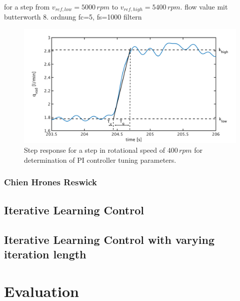 for a step from $v_{ref,low}=5000\, rpm$ to $v_{ref,high}=5400\, rpm$.
flow value mit butterworth 8. ordnung fc=5, fs=1000 filtern

\begin{figure}[ht]
  \centering
  \includegraphics[width=\textwidth]{images/chapt_5/param_calc_PI.pdf}
  \caption[Step response for determination of PI controller tuning parameters]{Step response for a step in rotational speed of $400\,rpm$ for determination of PI controller tuning parameters.}
  \label{fig:param_calc_PI}
\end{figure}

\subsubsection{Chien Hrones Reswick}

\subsection{Iterative Learning Control}

\subsection{Iterative Learning Control with varying iteration length}

\section{Evaluation}
